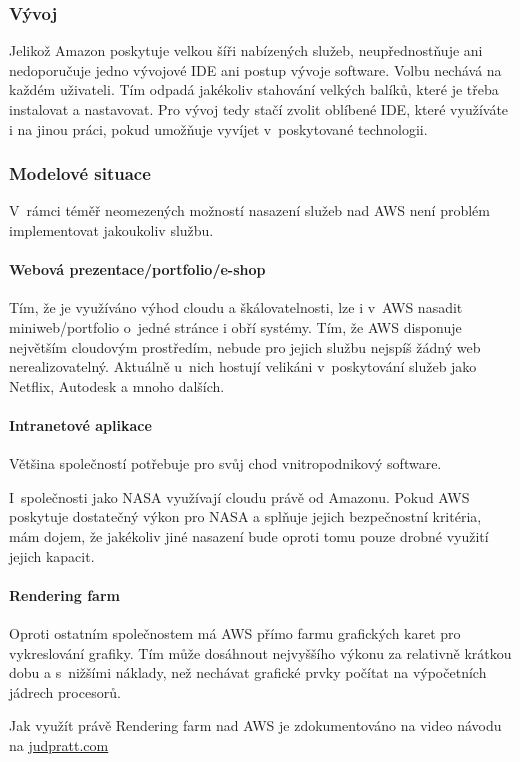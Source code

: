 \subsubsection{Vývoj}
Jelikož Amazon poskytuje velkou šíři nabízených služeb, neupřednostňuje ani nedoporučuje jedno vývojové IDE ani postup vývoje software. Volbu nechává na každém uživateli. Tím odpadá jakékoliv stahování velkých balíků, které je třeba instalovat a nastavovat. Pro vývoj tedy stačí zvolit oblíbené IDE, které využíváte i na jinou práci, pokud umožňuje vyvíjet v~poskytované technologii.

\subsubsection{Modelové situace}
V~rámci téměř neomezených možností nasazení služeb nad AWS není problém implementovat jakoukoliv službu.

\paragraph{Webová prezentace/portfolio/e-shop}
Tím, že je využíváno výhod cloudu a škálovatelnosti, lze i v~AWS nasadit miniweb/portfolio o~jedné stránce i obří systémy. Tím, že AWS disponuje největším cloudovým prostředím, nebude pro jejich službu nejspíš žádný web nerealizovatelný. Aktuálně u~nich hostují velikáni v~poskytování služeb jako Netflix, Autodesk a mnoho dalších.

\paragraph{Intranetové aplikace}
Většina společností potřebuje pro svůj chod vnitropodnikový software.

I~společnosti jako NASA využívají cloudu právě od Amazonu. Pokud AWS poskytuje dostatečný výkon pro NASA a splňuje jejich bezpečnostní kritéria, mám dojem, že jakékoliv jiné nasazení bude oproti tomu pouze drobné využití jejich kapacit.

\paragraph{Rendering farm}
Oproti ostatním společnostem má AWS přímo farmu grafických karet pro vykreslování grafiky. Tím může dosáhnout nejvyššího výkonu za relativně krátkou dobu a s~nižšími náklady, než nechávat grafické prvky počítat na výpočetních jádrech procesorů.

Jak využít právě Rendering farm nad AWS je zdokumentováno na video návodu na \href{http://www.judpratt.com/tutorials/ec2-renderfarm/}{judpratt.com\cite{judpratt:ec2renderfarm}}

